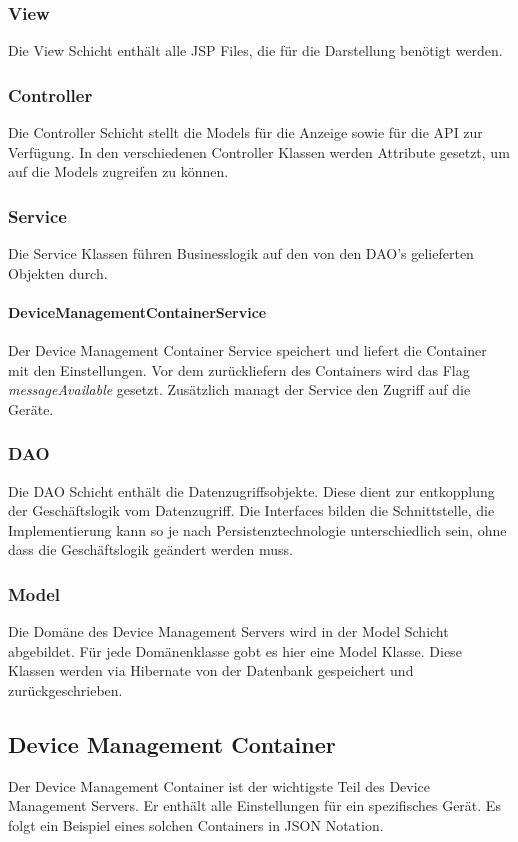 \subsubsection{View}
Die View Schicht enthält alle JSP Files, die für die Darstellung benötigt werden. 

\subsubsection{Controller}
Die Controller Schicht stellt die Models für die Anzeige sowie für die API zur Verfügung. In den verschiedenen Controller Klassen werden Attribute gesetzt, um auf die Models zugreifen zu können.

\subsubsection{Service}
Die Service Klassen führen Businesslogik auf den von den DAO's gelieferten Objekten durch.

\paragraph{DeviceManagementContainerService}
Der Device Management Container Service speichert und liefert die Container mit den Einstellungen. Vor dem zurückliefern des Containers wird das Flag \textit{messageAvailable} gesetzt. Zusätzlich managt der Service den Zugriff auf die Geräte. 


\subsubsection{DAO}
Die DAO Schicht enthält die Datenzugriffsobjekte. Diese dient zur entkopplung der Geschäftslogik vom Datenzugriff. Die Interfaces bilden die Schnittstelle, die Implementierung kann so je nach Persistenztechnologie unterschiedlich sein, ohne dass die Geschäftslogik geändert werden muss.


\subsubsection{Model}
Die Domäne des Device Management Servers wird in der Model Schicht abgebildet. Für jede Domänenklasse gobt es hier eine Model Klasse. Diese Klassen werden via Hibernate von der Datenbank gespeichert und zurückgeschrieben.

\subsection{Device Management Container}
Der Device Management Container ist der wichtigste Teil des Device Management Servers. Er enthält alle Einstellungen für ein spezifisches Gerät. Es folgt ein Beispiel eines solchen Containers in JSON Notation.

